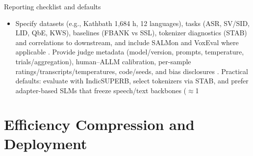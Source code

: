 \documentclass{article}
\begin{document}
Reporting checklist and defaults
\begin{itemize}
  \item Specify datasets (e.g., Kathbath 1,684 h, 12 languages), tasks (ASR, SV/SID, LID, QbE, KWS), baselines (FBANK vs SSL), tokenizer diagnostics (STAB) and correlations to downstream, and include SALMon and VoxEval where applicable \cite{entry2025indicsuperbspeechprocessinguniversalperf,vashishth2024stabspeechtokenizerassessmentbenchmark,maimon2025salmonsuiteacousticlanguagemodelevaluati,cui2025voxevalbenchmarkingknowledgeunderstandin}. Provide judge metadata (model/version, prompts, temperature, trials/aggregation), human--ALLM calibration, per-sample ratings/transcripts/temperatures, code/seeds, and bias disclosures \cite{wang2025bossbeyondsemanticspeech}. Practical defaults: evaluate with IndicSUPERB, select tokenizers via STAB, and prefer adapter-based SLMs that freeze speech/text backbones ($\approx$1%
\end{itemize}

















\section{Efficiency Compression and Deployment} \label{sec:Efficiency Compression and Deployment}
\end{document}
